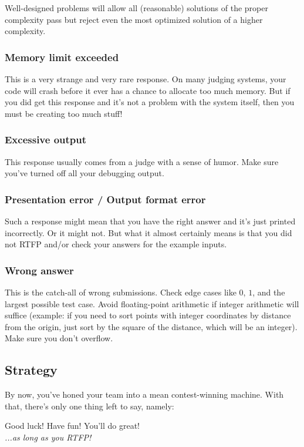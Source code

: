 \documentclass[a4paper,12pt]{article}
\begin{document}
Well-designed problems will allow all (reasonable) solutions of the proper complexity pass but reject even the most optimized solution of a higher complexity. 

\subsubsection{Memory limit exceeded}
This is a very strange and very rare response. On many judging systems, your code will crash before it ever has a chance to allocate too much memory. But if you did get this response and it's not a problem with the system itself, then you must be creating too much stuff! 

\subsubsection{Excessive output}
This response usually comes from a judge with a sense of humor. Make sure you've turned off all your debugging output.

\subsubsection{Presentation error / Output format error}
Such a response might mean that you have the right answer and it's just printed incorrectly. Or it might not. But what it almost certainly means is that you did not RTFP and/or check your answers for the example inputs.

\subsubsection{Wrong answer}
This is the catch-all of wrong submissions. Check edge cases like $0$, $1$, and the largest possible test case. Avoid floating-point arithmetic if integer arithmetic will suffice (example: if you need to sort points with integer coordinates by distance from the origin, just sort by the square of the distance, which will be an integer). Make sure you don't overflow.

\subsection{Strategy}
By now, you've honed your team into a mean contest-winning machine. With that, there's only one thing left to say, namely:\\[0.5cm]
\begin{center}
Good luck! Have fun! You'll do great!\\[0.5cm]
{\em ...as long as you RTFP!}
\end{center}
\end{document}
